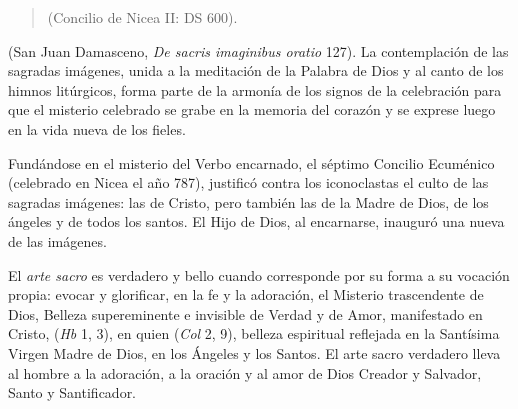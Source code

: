 	\begin{quote}
		 (Concilio de Nicea II: DS 600).
	\end{quote}
	
	  (San Juan Damasceno, \emph{De sacris imaginibus oratio} 127). La contemplación de las sagradas imágenes, unida a la meditación de la Palabra de Dios y al canto de los himnos litúrgicos, forma parte de la armonía de los signos de la celebración para que el misterio celebrado se grabe en la memoria del corazón y se exprese luego en la vida nueva de los fieles.
	
	 Fundándose en el misterio del Verbo encarnado, el séptimo Concilio Ecuménico (celebrado en Nicea el año 787), justificó contra los iconoclastas el culto de las sagradas imágenes: las de Cristo, pero también las de la Madre de Dios, de los ángeles y de todos los santos. El Hijo de Dios, al encarnarse, inauguró una nueva  de las imágenes.
	
	 El \emph{arte sacro} es verdadero y bello cuando corresponde por su forma a su vocación propia: evocar y glorificar, en la fe y la adoración, el Misterio trascendente de Dios, Belleza supereminente e invisible de Verdad y de Amor, manifestado en Cristo,  (\emph{Hb} 1, 3), en quien  (\emph{Col} 2, 9), belleza espiritual reflejada en la Santísima Virgen Madre de Dios, en los Ángeles y los Santos. El arte sacro verdadero lleva al hombre a la adoración, a la oración y al amor de Dios Creador y Salvador, Santo y Santificador.
	
